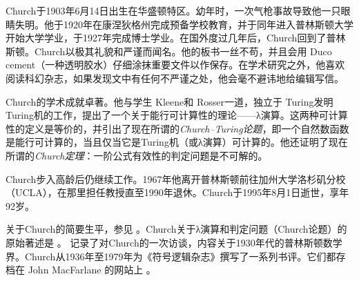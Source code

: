 \documentclass[../../../include/open-logic-section]{subfiles}
\begin{document}



Church于1903年6月14日出生在华盛顿特区。幼年时，一次气枪事故导致他一只眼睛失明。他于1920年在康涅狄格州完成预备学校教育，并于同年进入普林斯顿大学开始大学学业，于1927年完成博士学业。在国外度过几年后，Church回到了普林斯顿。Church以极其礼貌和严谨而闻名。他的板书一丝不苟，并且会用 Duco cement（一种透明胶水）仔细涂抹重要文件以作保存。在学术研究之外，他喜欢阅读科幻杂志，如果发现文中有任何不严谨之处，他会毫不避讳地给编辑写信。

Church的学术成就卓著。他与学生 Kleene和 Rosser一道，独立于 Turing发明Turing机的工作，提出了一个关于能行可计算性的理论——λ演算。这两种可计算性的定义是等价的，并引出了现在所谓的\emph{Church–Turing论题}，即一个自然数函数是能行可计算的，当且仅当它是Turing机（或λ演算）可计算的。他还证明了现在所谓的\emph{Church定理}：一阶公式有效性的判定问题是不可解的。

Church步入高龄后仍继续工作。1967年他离开普林斯顿前往加州大学洛杉矶分校（UCLA），在那里担任教授直至1990年退休。Church于1995年8月1日逝世，享年92岁。

\begin{reading}
关于Church的简要生平，参见 \citet{EndertonND}。Church关于λ演算和判定问题（Church论题）的原始著述是 \citet{Church1936,Church1936a}。\citet{Aspray1984} 记录了对Church的一次访谈，内容关于1930年代的普林斯顿数学界。Church从1936年至1979年为《符号逻辑杂志》撰写了一系列书评。它们都存档在 John MacFarlane 的网站上 \citep{MacFarlane2015}。
\end{reading}
\end{document}
